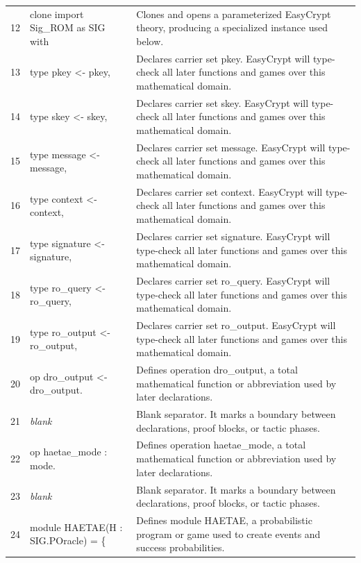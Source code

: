 \documentclass[10pt]{article}
\begin{document}
\begin{longtable}{r L{0.53\textwidth} L{0.37\textwidth}}
12 & {\ttfamily\scriptsize clone import Sig\_ROM as SIG with} & Clones and opens a parameterized EasyCrypt theory, producing a specialized instance used below. \\
13 & {\ttfamily\scriptsize   type pkey <- pkey,} & Declares carrier set pkey.  EasyCrypt will type-check all later functions and games over this mathematical domain. \\
14 & {\ttfamily\scriptsize   type skey <- skey,} & Declares carrier set skey.  EasyCrypt will type-check all later functions and games over this mathematical domain. \\
15 & {\ttfamily\scriptsize   type message <- message,} & Declares carrier set message.  EasyCrypt will type-check all later functions and games over this mathematical domain. \\
16 & {\ttfamily\scriptsize   type context <- context,} & Declares carrier set context.  EasyCrypt will type-check all later functions and games over this mathematical domain. \\
17 & {\ttfamily\scriptsize   type signature <- signature,} & Declares carrier set signature.  EasyCrypt will type-check all later functions and games over this mathematical domain. \\
18 & {\ttfamily\scriptsize   type ro\_query <- ro\_query,} & Declares carrier set ro\_query.  EasyCrypt will type-check all later functions and games over this mathematical domain. \\
19 & {\ttfamily\scriptsize   type ro\_output <- ro\_output,} & Declares carrier set ro\_output.  EasyCrypt will type-check all later functions and games over this mathematical domain. \\
20 & {\ttfamily\scriptsize   op dro\_output <- dro\_output.} & Defines operation dro\_output, a total mathematical function or abbreviation used by later declarations. \\
21 & {\ttfamily\scriptsize \emph{blank}} & Blank separator.  It marks a boundary between declarations, proof blocks, or tactic phases. \\
22 & {\ttfamily\scriptsize op haetae\_mode : mode.} & Defines operation haetae\_mode, a total mathematical function or abbreviation used by later declarations. \\
23 & {\ttfamily\scriptsize \emph{blank}} & Blank separator.  It marks a boundary between declarations, proof blocks, or tactic phases. \\
24 & {\ttfamily\scriptsize module HAETAE(H : SIG.POracle) = \{} & Defines module HAETAE, a probabilistic program or game used to create events and success probabilities. \\

\end{longtable}
\end{document}
